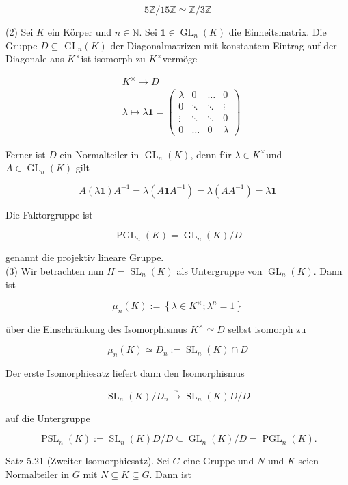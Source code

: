 \documentclass[10pt, letterpaper]{article}
\begin{document}
$$
5 \mathbb{Z} / 15 \mathbb{Z} \simeq \mathbb{Z} / 3 \mathbb{Z}
$$

(2) Sei $K$ ein Körper und $n \in \mathbb{N}$. Sei $\mathbf{1} \in \operatorname{GL}_{n}(K)$ die Einheitsmatrix. Die Gruppe $D \subseteq$ $\mathrm{GL}_{n}(K)$ der Diagonalmatrizen mit konstantem Eintrag auf der Diagonale aus $K^{\times}$ist isomorph zu $K^{\times}$vermöge

$$
\begin{aligned}
& K^{\times} \rightarrow D \\
& \lambda \mapsto \lambda \mathbf{1}=\left(\begin{array}{cccc}
\lambda & 0 & \ldots & 0 \\
0 & \ddots & \ddots & \vdots \\
\vdots & \ddots & \ddots & 0 \\
0 & \ldots & 0 & \lambda
\end{array}\right)
\end{aligned}
$$

Ferner ist $D$ ein Normalteiler in $\operatorname{GL}_{n}(K)$, denn für $\lambda \in K^{\times}$und $A \in \operatorname{GL}_{n}(K)$ gilt

$$
A(\lambda \mathbf{1}) A^{-1}=\lambda\left(A \mathbf{1} A^{-1}\right)=\lambda\left(A A^{-1}\right)=\lambda \mathbf{1}
$$

Die Faktorgruppe ist

$$
\operatorname{PGL}_{n}(K)=\operatorname{GL}_{n}(K) / D
$$

genannt die projektiv lineare Gruppe.\\
(3) Wir betrachten nun $H=\operatorname{SL}_{n}(K)$ als Untergruppe von $\operatorname{GL}_{n}(K)$. Dann ist

$$
\mu_{n}(K):=\left\{\lambda \in K^{\times} ; \lambda^{n}=1\right\}
$$

über die Einschränkung des Isomorphismus $K^{\times} \simeq D$ selbst isomorph zu

$$
\mu_{n}(K) \simeq D_{n}:=\operatorname{SL}_{n}(K) \cap D
$$

Der erste Isomorphiesatz liefert dann den Isomorphismus

$$
\operatorname{SL}_{n}(K) / D_{n} \xrightarrow{\sim} \operatorname{SL}_{n}(K) D / D
$$

auf die Untergruppe

$$
\operatorname{PSL}_{n}(K):=\operatorname{SL}_{n}(K) D / D \subseteq \operatorname{GL}_{n}(K) / D=\operatorname{PGL}_{n}(K) .
$$

Satz 5.21 (Zweiter Isomorphiesatz). Sei $G$ eine Gruppe und $N$ und $K$ seien Normalteiler in $G$ mit $N \subseteq K \subseteq G$. Dann ist
\end{document}

